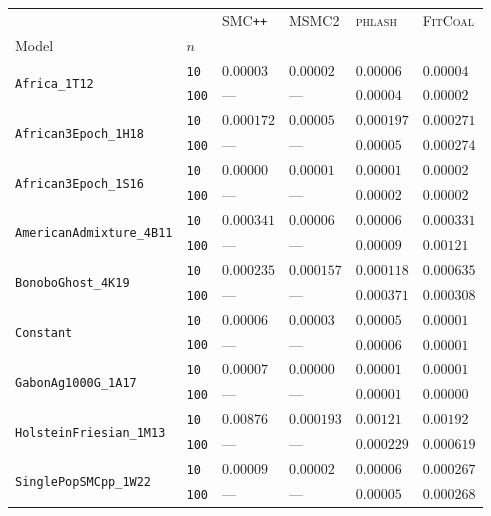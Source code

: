 \begin{footnotesize}
\begin{tabular}{llllll}
\toprule
 &  & \textsc{SMC}\texttt{{++}} & \textsc{MSMC2} & \textsc{phlash} & \textsc{FitCoal} \\
Model & $n$ &  &  &  &  \\
\midrule
\multirow[c]{2}{*}{\texttt{Africa\_1T12}} & \texttt{10} & $0.00003$ & $0.00002$ & $0.00006$ & $0.00004$ \\
 & \texttt{100} & --- & --- & $0.00004$ & $0.00002$ \\
\cline{1-6}
\multirow[c]{2}{*}{\texttt{African3Epoch\_1H18}} & \texttt{10} & $0.000172$ & $0.00005$ & $0.000197$ & $0.000271$ \\
 & \texttt{100} & --- & --- & $0.00005$ & $0.000274$ \\
\cline{1-6}
\multirow[c]{2}{*}{\texttt{African3Epoch\_1S16}} & \texttt{10} & $0.00000$ & $0.00001$ & $0.00001$ & $0.00002$ \\
 & \texttt{100} & --- & --- & $0.00002$ & $0.00002$ \\
\cline{1-6}
\multirow[c]{2}{*}{\texttt{AmericanAdmixture\_4B11}} & \texttt{10} & $0.000341$ & $0.00006$ & $0.00006$ & $0.000331$ \\
 & \texttt{100} & --- & --- & $0.00009$ & $0.00121$ \\
\cline{1-6}
\multirow[c]{2}{*}{\texttt{BonoboGhost\_4K19}} & \texttt{10} & $0.000235$ & $0.000157$ & $0.000118$ & $0.000635$ \\
 & \texttt{100} & --- & --- & $0.000371$ & $0.000308$ \\
\cline{1-6}
\multirow[c]{2}{*}{\texttt{Constant}} & \texttt{10} & $0.00006$ & $0.00003$ & $0.00005$ & $0.00001$ \\
 & \texttt{100} & --- & --- & $0.00006$ & $0.00001$ \\
\cline{1-6}
\multirow[c]{2}{*}{\texttt{GabonAg1000G\_1A17}} & \texttt{10} & $0.00007$ & $0.00000$ & $0.00001$ & $0.00001$ \\
 & \texttt{100} & --- & --- & $0.00001$ & $0.00000$ \\
\cline{1-6}
\multirow[c]{2}{*}{\texttt{HolsteinFriesian\_1M13}} & \texttt{10} & $0.00876$ & $0.000193$ & $0.00121$ & $0.00192$ \\
 & \texttt{100} & --- & --- & $0.000229$ & $0.000619$ \\
\cline{1-6}
\multirow[c]{2}{*}{\texttt{SinglePopSMCpp\_1W22}} & \texttt{10} & $0.00009$ & $0.00002$ & $0.00006$ & $0.000267$ \\
 & \texttt{100} & --- & --- & $0.00005$ & $0.000268$ \\

\end{tabular}
\end{footnotesize}
